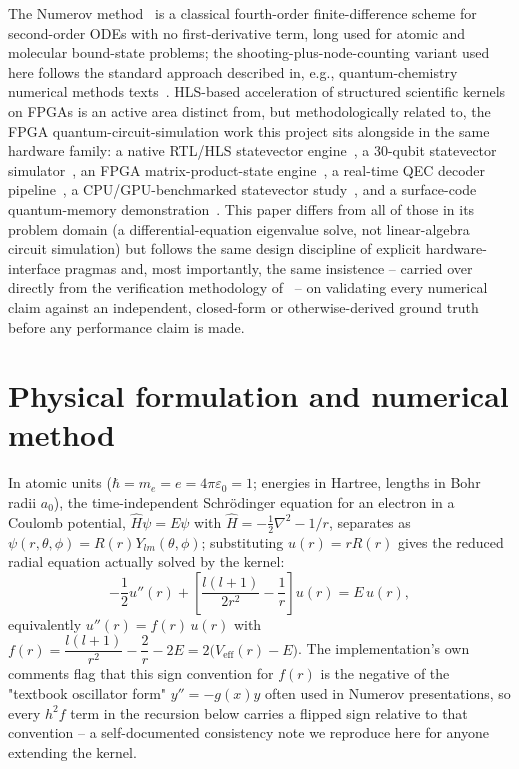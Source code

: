 \documentclass[pdflatex,sn-mathphys,Numbered]{sn-jnl}
\begin{document}
The Numerov method~\cite{numerov1924,cooley1961} is a classical fourth-order finite-difference scheme for second-order ODEs with no first-derivative term, long used for atomic and molecular bound-state problems; the shooting-plus-node-counting variant used here follows the standard approach described in, e.g., quantum-chemistry numerical methods texts~\cite{thijssen2007}. HLS-based acceleration of structured scientific kernels on FPGAs is an active area distinct from, but methodologically related to, the FPGA quantum-circuit-simulation work this project sits alongside in the same hardware family: a native RTL/HLS statevector engine~\cite{ali_rtl_statevector}, a 30-qubit statevector simulator~\cite{ali_30qubit_sim}, an FPGA matrix-product-state engine~\cite{ali_mps_engine}, a real-time QEC decoder pipeline~\cite{ali_shor_steane_qec}, a CPU/GPU-benchmarked statevector study~\cite{ali_statevector28}, and a surface-code quantum-memory demonstration~\cite{ali_surface_code}. This paper differs from all of those in its problem domain (a differential-equation eigenvalue solve, not linear-algebra circuit simulation) but follows the same design discipline of explicit hardware-interface pragmas and, most importantly, the same insistence -- carried over directly from the verification methodology of~\cite{ali_surface_code} -- on validating every numerical claim against an independent, closed-form or otherwise-derived ground truth before any performance claim is made.

\section{Physical formulation and numerical method}\label{sec:method}

In atomic units ($\hbar=m_e=e=4\pi\varepsilon_0=1$; energies in Hartree, lengths in Bohr radii $a_0$), the time-independent Schr\"odinger equation for an electron in a Coulomb potential, $\hat H\psi=E\psi$ with $\hat H=-\tfrac12\nabla^2-1/r$, separates as $\psi(r,\theta,\phi)=R(r)Y_{lm}(\theta,\phi)$; substituting $u(r)=rR(r)$ gives the reduced radial equation actually solved by the kernel:
\begin{equation}
-\frac12 u''(r) + \left[\frac{l(l+1)}{2r^2} - \frac1r\right] u(r) = E\,u(r),
\label{eq:radial}
\end{equation}
equivalently $u''(r) = f(r)\,u(r)$ with $f(r) = \dfrac{l(l+1)}{r^2} - \dfrac2r - 2E = 2\big(V_{\mathrm{eff}}(r)-E\big)$. The implementation's own comments flag that this sign convention for $f(r)$ is the negative of the "textbook oscillator form" $y''=-g(x)y$ often used in Numerov presentations, so every $h^2 f$ term in the recursion below carries a flipped sign relative to that convention -- a self-documented consistency note we reproduce here for anyone extending the kernel.
\end{document}
